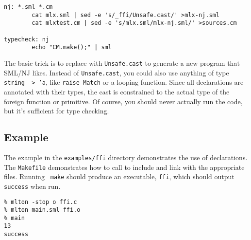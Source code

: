 \begin{verbatim}
nj: *.sml *.cm
        cat mlx.sml | sed -e 's/_ffi/Unsafe.cast/' >mlx-nj.sml
        cat mlxtest.cm | sed -e 's/mlx.sml/mlx-nj.sml/' >sources.cm

typecheck: nj
        echo "CM.make();" | sml
\end{verbatim}

The basic trick is to replace {\ffi} with {\tt Unsafe.cast} to generate a new
program that SML/NJ likes.  Instead of {\tt Unsafe.cast}, you could also use
anything of type {\tt string -> 'a}, like {\tt raise Match} or a looping
function.  Since all {\ffi} declarations are annotated with their types, the
cast is constrained to the actual type of the foreign function or primitive. Of
course, you should never actually run the code, but it's sufficient for type
checking.

\subsection{Example}

The example in the {\tt examples/ffi} directory demonstrates the use of
{\ffi} declarations.  The {\tt Makefile} demonstrates how
to call {\mlton} to include and link with the appropriate files.  Running {\tt
make} should produce an executable, {\tt ffi}, which should output {\tt success}
when run.

\begin{verbatim}
% mlton -stop o ffi.c
% mlton main.sml ffi.o
% main
13
success
\end{verbatim}
